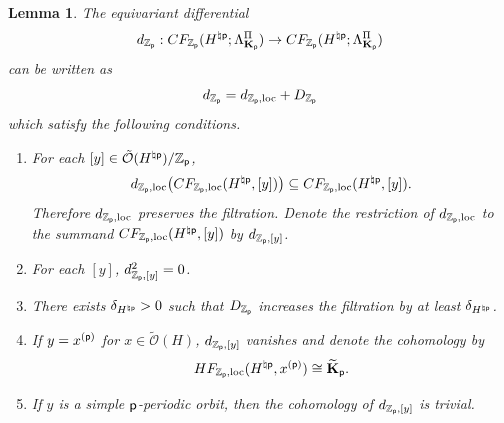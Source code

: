 \documentclass[reqno, 10pt]{amsart}
\numberwithin{equation}{section}
\numberwithin{equation}{section}
\renewcommand{\subset}{\subseteq}
\newtheorem{lemma}[thm]{Lemma}
\theoremstyle{definition}
\theoremstyle{remark}
\newcommand{\beqn}{\begin{equation*}}
\newcommand{\eeqn}{\end{equation*}}
\newcommand{\mb}{\mathbb}
\newcommand{\mc}{\mathcal}
\newcommand{\p}{{\sf p}}
\newcommand{\kp}{{\bf K}_{\sf p}}
\newcommand{\tkp}{\wt{\bf K}_{\sf p}}
\newcommand{\zp}{{{\mb Z}_{\sf p}}}
\newcommand{\wt}{\widetilde}
\begin{document}
\begin{lemma}
The equivariant differential
\beqn
d_{\zp}: CF_{\zp}(H^{\natural \p}; \Lambda_{\kp}^{\Pi}) \to CF_{\zp}(H^{\natural \p}; \Lambda_{\kp}^\Pi)
\eeqn
can be written as 
\beqn
d_{\zp} = d_{\zp, {\rm loc}} + D_{\zp}
\eeqn
which satisfy the following conditions.

\begin{enumerate}

\item For each $[y] \in \tilde {\mc O}(H^{\natural \p})/\zp$, 
\beqn
d_{\zp, {\rm loc}} \big( CF_{\zp, {\rm loc}}(H^{\natural \p}, [y])  \big) \subset CF_{\zp, {\rm loc}}(H^{\natural \p}, [y]).
\eeqn
Therefore $d_{\zp, {\rm loc}}$ preserves the filtration. Denote the restriction of $d_{\zp, {\rm loc}}$ to the summand $CF_{\zp, {\rm loc}}(H^{\natural \p}, [y])$ by $d_{\zp, [y]}$.

\item For each $[y]$, $d_{\zp, [y]}^2 = 0$.

\item There exists $\delta_{H^{\natural \p}}>0$ such that $D_{\zp}$ increases the filtration by at least $\delta_{H^{\natural \p}}$. 

\item If $y = x^{(\p)}$ for $x \in \tilde {\mc O}(H)$, $d_{\zp, [y]}$ vanishes and denote the cohomology by 
\beqn
HF_{\zp, {\rm loc}}(H^{\natural \p}, x^{(\p)}) \cong \tkp.
\eeqn

\item If $y$ is a simple $\p$-periodic orbit, then the cohomology of $d_{\zp, [y]}$ is trivial.
\end{enumerate}
\end{lemma}
\end{document}
